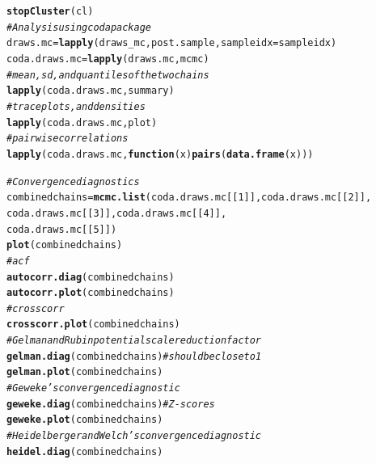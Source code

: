 \documentclass[12pt]{article}\usepackage[]{graphicx}\usepackage[]{color}
\makeatletter
\newcommand{\hlnum}[1]{\textcolor[rgb]{0.686,0.059,0.569}{#1}}%
\newcommand{\hlcom}[1]{\textcolor[rgb]{0.678,0.584,0.686}{\textit{#1}}}%
\newcommand{\hlstd}[1]{\textcolor[rgb]{0.345,0.345,0.345}{#1}}%
\newcommand{\hlkwa}[1]{\textcolor[rgb]{0.161,0.373,0.58}{\textbf{#1}}}%
\newcommand{\hlkwb}[1]{\textcolor[rgb]{0.69,0.353,0.396}{#1}}%
\newcommand{\hlkwc}[1]{\textcolor[rgb]{0.333,0.667,0.333}{#1}}%
\newcommand{\hlkwd}[1]{\textcolor[rgb]{0.737,0.353,0.396}{\textbf{#1}}}%
\newenvironment{kframe}{%
 \def\at@end@of@kframe{}%
 \ifinner\ifhmode%
  \def\at@end@of@kframe{\end{minipage}}%
  \begin{minipage}{\columnwidth}%
 \fi\fi%
 \def\FrameCommand##1{\hskip\@totalleftmargin \hskip-\fboxsep
 \colorbox{shadecolor}{##1}\hskip-\fboxsep
     \hskip-\linewidth \hskip-\@totalleftmargin \hskip\columnwidth}%
 \MakeFramed {\advance\hsize-\width
   \@totalleftmargin\z@ \linewidth\hsize
   \@setminipage}}%
 {\par\unskip\endMakeFramed%
 \at@end@of@kframe}
\newenvironment{knitrout}{}{} %
\makeatother
\begin{document}
\begin{knitrout}
\begin{kframe}
\begin{alltt}
\hlkwd{stopCluster}\hlstd{(cl)}
\hlcom{# Analysis using coda package}
\hlstd{draws.mc} \hlkwb{=} \hlkwd{lapply}\hlstd{(draws_mc, post.sample,} \hlkwc{sampleidx} \hlstd{= sampleidx)}
\hlstd{coda.draws.mc} \hlkwb{=} \hlkwd{lapply}\hlstd{(draws.mc, mcmc)}
\hlcom{# mean, sd, and quantiles of the two chains}
\hlkwd{lapply}\hlstd{(coda.draws.mc, summary)}
\hlcom{# traceplots, and densities }
\hlkwd{lapply}\hlstd{(coda.draws.mc, plot)}
\hlcom{# pairwise correlations}
\hlkwd{lapply}\hlstd{(coda.draws.mc,} \hlkwa{function}\hlstd{(}\hlkwc{x}\hlstd{)} \hlkwd{pairs}\hlstd{(}\hlkwd{data.frame}\hlstd{(x)))}

\hlcom{# Convergence diagnostics}
\hlstd{combinedchains} \hlkwb{=} \hlkwd{mcmc.list}\hlstd{(coda.draws.mc[[}\hlnum{1}\hlstd{]], coda.draws.mc[[}\hlnum{2}\hlstd{]],}
                           \hlstd{coda.draws.mc[[}\hlnum{3}\hlstd{]], coda.draws.mc[[}\hlnum{4}\hlstd{]],}
                           \hlstd{coda.draws.mc[[}\hlnum{5}\hlstd{]])}
\hlkwd{plot}\hlstd{(combinedchains)}
\hlcom{# acf}
\hlkwd{autocorr.diag}\hlstd{(combinedchains)}
\hlkwd{autocorr.plot}\hlstd{(combinedchains)}
\hlcom{# crosscorr}
\hlkwd{crosscorr.plot}\hlstd{(combinedchains)}
\hlcom{# Gelman and Rubin potential scale reduction factor }
\hlkwd{gelman.diag}\hlstd{(combinedchains)}  \hlcom{# should be close to 1}
\hlkwd{gelman.plot}\hlstd{(combinedchains)}
\hlcom{# Geweke’s convergence diagnostic}
\hlkwd{geweke.diag}\hlstd{(combinedchains)}  \hlcom{# Z-scores}
\hlkwd{geweke.plot}\hlstd{(combinedchains)}
\hlcom{# Heidelberger and Welch’s convergence diagnostic}
\hlkwd{heidel.diag}\hlstd{(combinedchains)}


\end{alltt}
\end{kframe}
\end{knitrout}
\end{document}
